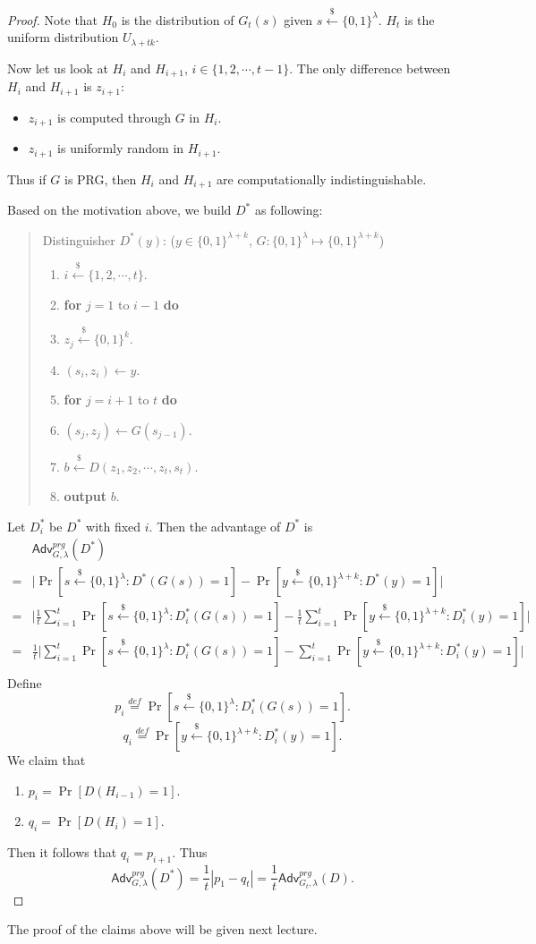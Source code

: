 \documentclass[12pt]{article}
\newcommand{\eqdef}{\stackrel{def}{=}}
\newcommand{\bits}{\{0,1\}}
\newcommand{\getsr}{\stackrel{\$}{\gets}}
\newcommand{\Adv}{\mathsf{Adv}}
\newcommand{\tab}{\hspace{0.3in}}
\theoremstyle{definition}
\begin{document}
\begin{proof}
Note that $H_0$ is the distribution of $G_t(s)$ given $s \getsr \bits^\lambda$. $H_t$ is the uniform distribution $U_{\lambda+tk}$.

Now let us look at $H_i$ and $H_{i+1}$, $i \in \{1, 2, \cdots, t-1\}$. The only difference between $H_i$ and $H_{i+1}$ is $z_{i+1}$:
\begin{itemize}
\item $z_{i+1}$ is computed through $G$ in $H_i$.
\item $z_{i+1}$ is uniformly random in $H_{i+1}$.
\end{itemize}
Thus if $G$ is PRG, then $H_i$ and $H_{i+1}$ are computationally indistinguishable.

Based on the motivation above, we build $D^*$ as following:
\begin{quote}
Distinguisher $D^* (y)$: ($y \in \bits^{\lambda+k}$, $G : \bits^\lambda \mapsto \bits^{\lambda+k}$)
\begin{enumerate}
\item $i \getsr \{1, 2, \cdots, t\}$.
\item {\bf for} $j=1$ to $i-1$ {\bf do}
\item \tab $z_j \getsr \bits^k$.
\item $(s_i, z_i) \gets y$.
\item {\bf for} $j=i+1$ to $t$ {\bf do}
\item \tab $(s_j, z_j) \gets G(s_{j-1})$.
\item $b \getsr D(z_1, z_2, \cdots, z_t, s_t)$.
\item {\bf output} $b$.
\end{enumerate}
\end{quote}
Let $D_i^*$ be $D^*$ with fixed $i$. Then the advantage of $D^*$ is
$$\begin{aligned}
&\Adv_{G,\lambda}^{prg}(D^*) \\
=& \bigg| \Pr[s \getsr \bits^\lambda : D^*(G(s)) = 1] - \Pr[y \getsr \bits^{\lambda+k} : D^*(y) = 1] \bigg| \\
=& \bigg| \frac{1}{t}\sum_{i=1}^t \Pr[s \getsr \bits^\lambda : D_i^*(G(s)) = 1] - \frac{1}{t}\sum_{i=1}^t \Pr[y \getsr \bits^{\lambda+k} : D_i^*(y) = 1] \bigg| \\
=& \frac{1}{t}\bigg| \sum_{i=1}^t \Pr[s \getsr \bits^\lambda : D_i^*(G(s)) = 1] - \sum_{i=1}^t \Pr[y \getsr \bits^{\lambda+k} : D_i^*(y) = 1] \bigg| \\
\end{aligned}$$
Define
$$p_i \eqdef \Pr[s \getsr \bits^\lambda : D_i^*(G(s)) = 1].$$
$$q_i \eqdef \Pr[y \getsr \bits^{\lambda+k} : D_i^*(y) = 1].$$
We claim that
\begin{enumerate}
\item $p_i = \Pr[D(H_{i-1}) = 1]$.
\item $q_i = \Pr[D(H_i) = 1]$.
\end{enumerate}
Then it follows that $q_i = p_{i+1}$. Thus
$$\Adv_{G,\lambda}^{prg}(D^*) = \frac{1}{t}|p_1 - q_t| = \frac{1}{t} \Adv_{G_t, \lambda}^{prg}(D).$$
\end{proof}
The proof of the claims above will be given next lecture.
\end{document}
